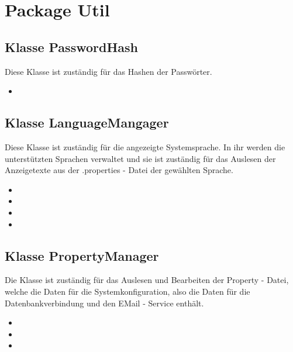 	
	
	\section{Package Util}
	
	\subsection{Klasse PasswordHash}
	Diese Klasse ist zuständig für das Hashen der Passwörter.
	\begin{itemize}
		\item {}
	\end{itemize}
	
	\subsection{Klasse LanguageMangager}
	Diese Klasse ist zuständig für die angezeigte Systemsprache. In ihr werden die unterstützten Sprachen verwaltet und sie ist zuständig für das Auslesen der Anzeigetexte aus der .properties - Datei der gewählten Sprache.
	\begin{itemize}
		\item {}
		\item {}
		\item {}
		\item {}
	\end{itemize}
	
	\subsection{Klasse PropertyManager}
	Die Klasse ist zuständig für das Auslesen und Bearbeiten der Property - Datei, welche die Daten für die Systemkonfiguration, also die Daten für die Datenbankverbindung und den EMail - Service enthält.
	\begin{itemize}
		\item {}
		\item {}
		\item {}
	\end{itemize}
	
